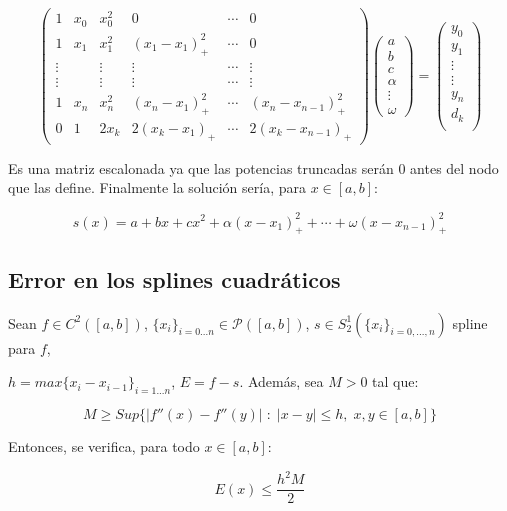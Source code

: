 \documentclass[11pt,spanish,]{article}
\theoremstyle{definition} \newtheorem*{definicion}{Definición}
\begin{document}
\begin{equation*}
\begin{pmatrix}
    1 & x_0 & x_0^2   & 0 & \cdots & 0\\
    1 & x_1 & x_1^2   & (x_1-x_1)_{+}^2 & \cdots & 0\\
    \vdots& & \vdots  & \vdots          & \cdots & \vdots \\
    \vdots& & \vdots  & \vdots          & \cdots & \vdots \\
    1 & x_n & x_n^2   & (x_n-x_1)_{+}^2 & \cdots & (x_n-x_{n-1})_{+}^2\\
    0 &   1 &  2x_k & 2(x_k-x_1)_{+} & \cdots & 2(x_k-x_{n-1})_{+}
\end{pmatrix}
\begin{pmatrix}
    a \\
    b \\
    c \\
    \alpha \\
    \vdots \\
    \omega
\end{pmatrix}
=
\begin{pmatrix}
    y_0\\
    y_1\\
    \vdots\\
    \vdots\\
    y_n\\
    d_k\\
\end{pmatrix}
\end{equation*}

Es una matriz escalonada ya que las potencias truncadas serán $0$ antes
del nodo que las define. Finalmente la solución sería, para
$x \in [a,b]$:

\[s(x) = a + bx + cx^2 + \alpha(x-x_1)_+^2 + \cdots + \omega(x-x_{n-1})_+^2\]

\subsection{Error en los splines
cuadráticos}\label{error-en-los-splines-cuadruxe1ticos}

\begin{teorema}
Sean $f \in C^2([a,b])$, $\{x_i\}_{i = 0...n} \in \mathscr{P}([a,b])$,
$s \in S_2^1(\{x_i\}_{i = 0,...,n})$ spline para $f$,

$h = max\{x_i - x_{i-1}\}_{i = 1...n}$, $E = f - s$.
Además, sea $M >0$ tal que:

\[
 M \geq Sup \{|f''(x) - f''(y)| \; : \; |x - y| \leq h, \; x,y \in [a,b] \}
 \]

Entonces, se verifica, para todo $x \in [a,b]$:

\begin{equation}
E(x) \leq \frac{h^2M}{2}
\end{equation}

\end{teorema}
\end{document}
